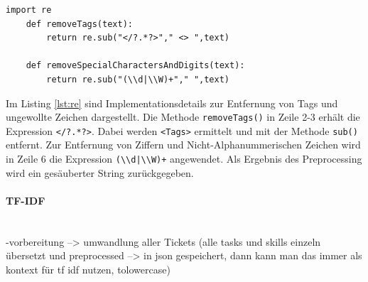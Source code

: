 \begin{lstlisting}[caption={Implementation der Methode removeTags() und removeSpecialCharactersAndDigits() des Moduls \emph{preprocessing.py}}, label=lst:re]
	import re
	def removeTags(text):
		return re.sub("</?.*?>"," <> ",text)
	
	def removeSpecialCharactersAndDigits(text):
		return re.sub("(\\d|\\W)+"," ",text)
\end{lstlisting}
Im Listing \ref{lst:re} sind Implementationsdetails zur Entfernung von Tags und ungewollte Zeichen dargestellt. Die Methode \lstinline{removeTags()} in Zeile 2-3 erhält die Expression \lstinline{</?.*?>}. Dabei werden \lstinline{<Tags>} ermittelt und mit der Methode \lstinline{sub()} entfernt. Zur Entfernung von Ziffern und Nicht-Alphanummerischen Zeichen wird in Zeile 6 die Expression \lstinline{(\\d|\\W)+} angewendet. Als Ergebnis des Preprocessing wird ein gesäuberter String zurückgegeben.
\paragraph{TF-IDF}\mbox{}\\
-vorbereitung --> umwandlung aller Tickets (alle tasks und skills einzeln übersetzt und preprocessed --> in json gespeichert, dann kann man das immer als kontext für tf idf nutzen, tolowercase)


